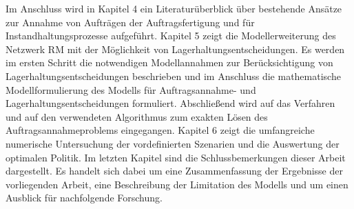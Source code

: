 Im Anschluss wird in Kapitel 4 ein Literaturüberblick über bestehende Ansätze zur Annahme von Aufträgen der Auftragsfertigung und für Instandhaltungsprozesse aufgeführt. Kapitel 5 zeigt die Modellerweiterung des Netzwerk RM mit der Möglichkeit von Lagerhaltungsentscheidungen. Es werden im ersten Schritt die notwendigen Modellannahmen zur Berücksichtigung von Lagerhaltungsentscheidungen beschrieben und im Anschluss die mathematische Modellformulierung des Modells für Auftragsannahme- und Lagerhaltungsentscheidungen formuliert. Abschließend wird auf das Verfahren und auf den verwendeten Algorithmus zum exakten Lösen des Auftragsannahmeproblems eingegangen. Kapitel 6 zeigt die umfangreiche numerische Untersuchung der vordefinierten Szenarien und die Auswertung der optimalen Politik. Im letzten Kapitel sind die Schlussbemerkungen dieser Arbeit dargestellt. Es handelt sich dabei um eine Zusammenfassung der Ergebnisse der vorliegenden Arbeit, eine Beschreibung der Limitation des Modells und um einen Ausblick für nachfolgende Forschung.